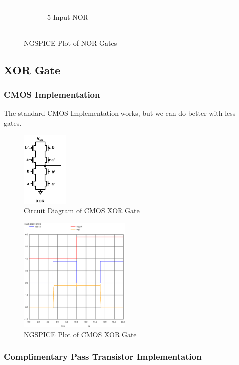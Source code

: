 \documentclass[conference]{IEEEtran}
\begin{document}
\begin{figure}[H]
\begin{tabular}{cc}
\begin{subfigure}{0.44\linewidth}
            \caption{5 Input NOR}
        \end{subfigure}
    \end{tabular}
    \caption{NGSPICE Plot of NOR Gates}
\end{figure}

\subsection{XOR Gate}

\subsubsection{CMOS Implementation}

The standard CMOS Implementation works, but we can do better with less gates.

\begin{figure}[H]
    \centering
    \includegraphics[width=0.2\textwidth]{images/xor_cmos_circuit_diagram.png}
    \caption{Circuit Diagram of CMOS XOR Gate}
\end{figure}

\begin{figure}[H]
    \centering
    \includegraphics[width=0.48\textwidth]{images/xor_cmos_tran.eps}
    \caption{NGSPICE Plot of CMOS XOR Gate}
\end{figure}

\subsubsection{Complimentary Pass Transistor Implementation}
\end{document}
